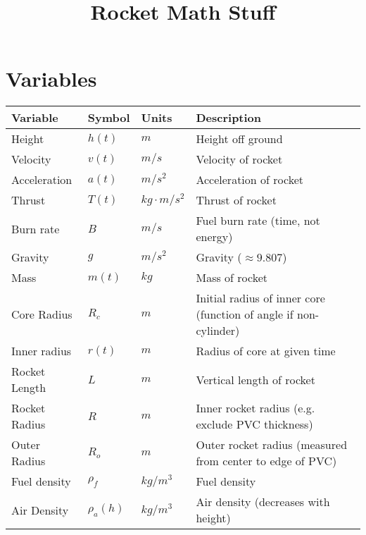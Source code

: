 \documentclass[12pt,a4paper]{article}
\title{Rocket Math Stuff}
\date{}
\begin{document}
\maketitle


\section{Variables}


\begin{tabular}{l | l | l | l}
    \textbf{Variable} & \textbf{Symbol} & \textbf{Units} & \textbf{Description} \\
    \hline
    Height             & $h(t)$      & $m$                   & Height off ground \\
    Velocity           & $v(t)$      & $m/s$                 & Velocity of rocket \\
    Acceleration       & $a(t)$      & $m/s^2$               & Acceleration of rocket \\
    Thrust             & $T(t)$      & $kg\cdot m/s^2$       & Thrust of rocket \\
    Burn rate          & $B$         & $m/s$                 & Fuel burn rate (time, not energy) \\
    Gravity            & $g$         & $m/s^2$               & Gravity ($\approx 9.807$) \\
    Mass               & $m(t)$      & $kg$                  & Mass of rocket \\
    Core Radius        & $R_c$       & $m$                   & Initial radius of inner core (function of angle if non-cylinder) \\
    Inner radius       & $r(t)$      & $m$                   & Radius of core at given time \\
    Rocket Length      & $L$         & $m$                   & Vertical length of rocket \\
    Rocket Radius      & $R$         & $m$                   & Inner rocket radius (e.g. exclude PVC thickness) \\
    Outer Radius       & $R_o$       & $m$                   & Outer rocket radius (measured from center to edge of PVC) \\
    Fuel density       & $\rho_f$    & $kg/m^3$              & Fuel density \\
    Air Density        & $\rho_a(h)$ & $kg/m^3$              & Air density (decreases with height) \\

\end{tabular}
\end{document}
